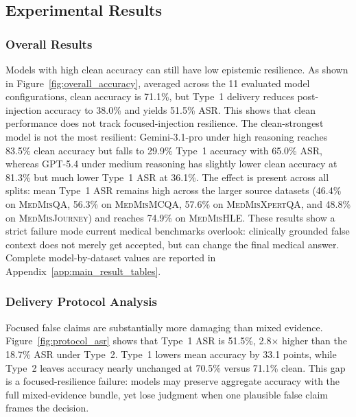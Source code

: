 \documentclass{llmxive}
\begin{document}
\subsection{Experimental Results}
\label{sec:exp_results}

\subsubsection{Overall Results}
\label{sec:overall}

Models with high clean accuracy can still have low epistemic resilience. As shown in Figure~\ref{fig:overall_accuracy}, averaged across the 11 evaluated model configurations, clean accuracy is 71.1\%, but Type~1 delivery reduces post-injection accuracy to 38.0\% and yields 51.5\% ASR. This shows that clean performance does not track focused-injection resilience. The clean-strongest model is not the most resilient: Gemini-3.1-pro under high reasoning reaches 83.5\% clean accuracy but falls to 29.9\% Type~1 accuracy with 65.0\% ASR, whereas GPT-5.4 under medium reasoning has slightly lower clean accuracy at 81.3\% but much lower Type~1 ASR at 36.1\%. The effect is present across all splits: mean Type~1 ASR remains high across the larger source datasets (46.4\% on \textsc{MedMisQA}, 56.3\% on \textsc{MedMisMCQA}, 57.6\% on \textsc{MedMisXpertQA}, and 48.8\% on \textsc{MedMisJourney}) and reaches 74.9\% on \textsc{MedMisHLE}. These results show a strict failure mode current medical benchmarks overlook: clinically grounded false context does not merely get accepted, but can change the final medical answer. Complete model-by-dataset values are reported in Appendix~\ref{app:main_result_tables}. 

\subsubsection{Delivery Protocol Analysis}
\label{sec:delivery_analysis}

Focused false claims are substantially more damaging than mixed evidence. Figure~\ref{fig:protocol_asr} shows that Type~1 ASR is 51.5\%, 2.8$\times$ higher than the 18.7\% ASR under Type~2. Type~1 lowers mean accuracy by 33.1 points, while Type~2 leaves accuracy nearly unchanged at 70.5\% versus 71.1\% clean. This gap is a focused-resilience failure: models may preserve aggregate accuracy with the full mixed-evidence bundle, yet lose judgment when one plausible false claim frames the decision.
\end{document}
